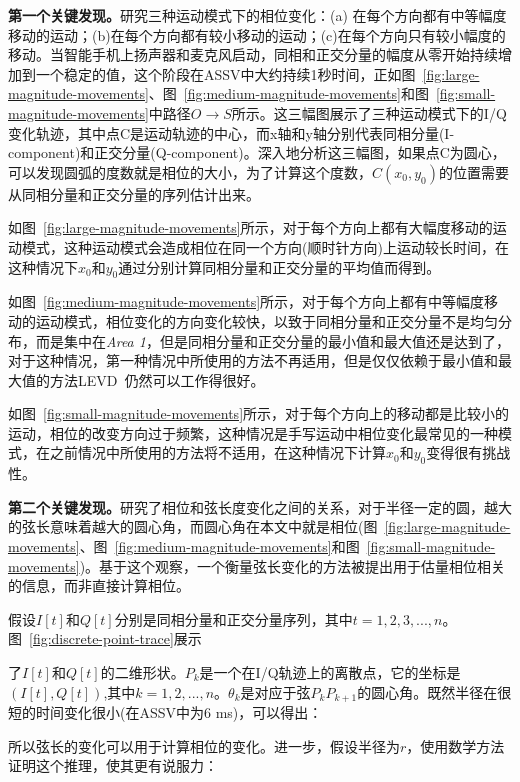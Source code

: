 \textbf{第一个关键发现。}研究三种运动模式下的相位变化：(a) 在每个方向都有中等幅度移动的运动；(b)在每个方向都有较小移动的运动；(c)在每个方向只有较小幅度的移动。当智能手机上扬声器和麦克风启动，同相和正交分量的幅度从零开始持续增加到一个稳定的值，这个阶段在ASSV中大约持续1秒时间，正如图~\ref{fig:large-magnitude-movements}、图~\ref{fig:medium-magnitude-movements}和图~\ref{fig:small-magnitude-movements}中路径$O\rightarrow S$所示。这三幅图展示了三种运动模式下的I/Q变化轨迹，其中点C是运动轨迹的中心，而x轴和y轴分别代表同相分量(I-component)和正交分量(Q-component)。深入地分析这三幅图，如果点C为圆心，可以发现圆弧的度数就是相位的大小，为了计算这个度数，$C(x_{0},y_{0})$的位置需要从同相分量和正交分量的序列估计出来。

如图~\ref{fig:large-magnitude-movements}所示，对于每个方向上都有大幅度移动的运动模式，这种运动模式会造成相位在同一个方向(顺时针方向)上运动较长时间，在这种情况下$x_0$和$y_0$通过分别计算同相分量和正交分量的平均值而得到。


如图~\ref{fig:medium-magnitude-movements}所示，对于每个方向上都有中等幅度移动的运动模式，相位变化的方向变化较快，以致于同相分量和正交分量不是均匀分布，而是集中在\textit{Area 1}，但是同相分量和正交分量的最小值和最大值还是达到了，对于这种情况，第一种情况中所使用的方法不再适用，但是仅仅依赖于最小值和最大值的方法LEVD~\cite{wang2016device}仍然可以工作得很好。


如图~\ref{fig:small-magnitude-movements}所示，对于每个方向上的移动都是比较小的运动，相位的改变方向过于频繁，这种情况是手写运动中相位变化最常见的一种模式，在之前情况中所使用的方法将不适用，在这种情况下计算$x_{0}$和$y_{0}$变得很有挑战性。


\textbf{第二个关键发现。}研究了相位和弦长度变化之间的关系，对于半径一定的圆，越大的弦长意味着越大的圆心角，而圆心角在本文中就是相位(图~\ref{fig:large-magnitude-movements}、图~\ref{fig:medium-magnitude-movements}和图~\ref{fig:small-magnitude-movements})。基于这个观察，一个衡量弦长变化的方法被提出用于估量相位相关的信息，而非直接计算相位。

假设$I[t]$和$Q[t]$分别是同相分量和正交分量序列，其中$t=1,2,3,...,n$。图~\ref{fig:discrete-point-trace}展示

了$I[t]$和$Q[t]$的二维形状。$P_k$是一个在I/Q轨迹上的离散点，它的坐标是$(I[t],Q[t])$,其中$k=1,2,...,n$。$\theta_{k}$是对应于弦$P_{k}P_{k+1}$的圆心角。既然半径在很短的时间变化很小(在ASSV中为6 ms)，可以得出：

所以弦长的变化可以用于计算相位的变化。进一步，假设半径为$r$，使用数学方法证明这个推理，使其更有说服力：

